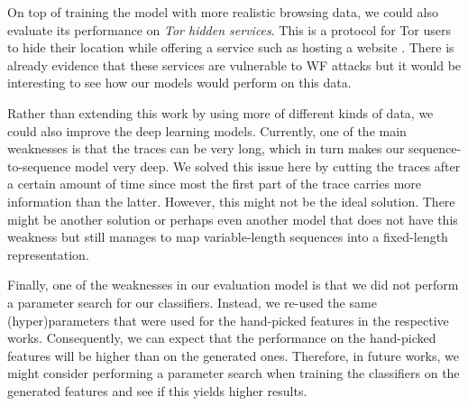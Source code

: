 On top of training the model with more realistic browsing data, we could also evaluate its performance on \textit{Tor hidden services}.
This is a protocol for Tor users to hide their location while offering a service such as hosting a website \cite{tor_hidden_services}.
There is already evidence that these services are vulnerable to WF attacks \cite{kfingerprinting} but it would be interesting to see how our models would perform on this data.

Rather than extending this work by using more of different kinds of data, we could also improve the deep learning models.
Currently, one of the main weaknesses is that the traces can be very long, which in turn makes our sequence-to-sequence model very deep.
We solved this issue here by cutting the traces after a certain amount of time since most the first part of the trace carries more information than the latter.
However, this might not be the ideal solution.
There might be another solution or perhaps even another model that does not have this weakness but still manages to map variable-length sequences into a fixed-length representation.

Finally, one of the weaknesses in our evaluation model is that we did not perform a parameter search for our classifiers.
Instead, we re-used the same (hyper)parameters that were used for the hand-picked features in the respective works.
Consequently, we can expect that the performance on the hand-picked features will be higher than on the generated ones.
Therefore, in future works, we might consider performing a parameter search when training the classifiers on the generated features and see if this yields higher results.
